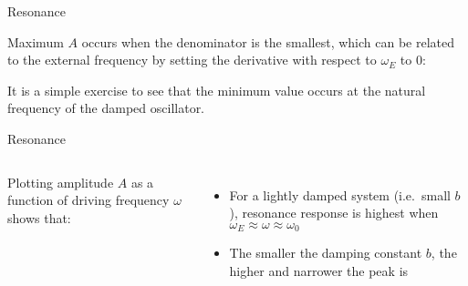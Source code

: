 \documentclass[12pt,compress,aspectratio=169]{beamer}
\begin{document}
\begin{frame}{Resonance}
  
  Maximum $A$ occurs when the denominator is the smallest, which can be related
  to the external frequency by setting the derivative with respect to
  $\omega_E$ to 0:


  It is a simple exercise
  to see that the minimum value occurs at the natural frequency of
  the damped oscillator.

%  
\end{frame}



\begin{frame}{Resonance}
  \begin{columns}

    Plotting amplitude $A$ as a function of driving frequency $\omega$ shows
    that:
    \begin{itemize}
    \item For a lightly damped system (i.e.\ small $b$), resonance response is
      highest when $\omega_E\approx\omega\approx\omega_0$
    \item The smaller the damping constant $b$, the higher and narrower the
      peak is
    \end{itemize}
  \end{columns}
\end{frame}
\end{document}
